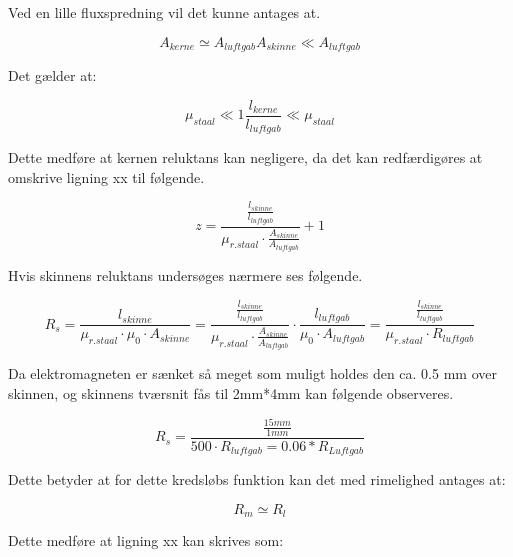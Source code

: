 Ved en lille fluxspredning vil det kunne antages at.

\begin{equation}
A_{kerne} \simeq A_{luftgab}
A_{skinne} \ll A_{luftgab}
\end{equation}

Det gælder at:

\begin{equation}
\mu_{staal} \ll 1
\frac{l_{kerne}}{l_{luftgab}}\ll \mu_{staal}
\end{equation}

Dette medføre at kernen reluktans kan negligere, da det kan redfærdigøres at omskrive ligning xx til følgende.

\begin{equation}
z =
\frac{
	\frac{l_{skinne}}{l_{luftgab}} }
{\mu_{r.staal} \cdot \frac{A_{skinne}}{A_{luftgab}} }
+ 1
\end{equation}

Hvis skinnens reluktans undersøges nærmere ses følgende.


\begin{equation}
R_s =  \frac{l_{skinne}}{\mu_{r.staal} \cdot \mu_0 \cdot A_{skinne} }
=
\frac{
	\frac{l_{skinne}}{l_{luftgab}} }
{\mu_{r.staal} \cdot \frac{A_{skinne}}{A_{luftgab}} }
\cdot \frac{l_{luftgab}}{\mu_0 \cdot A_{luftgab}}
=
\frac{
	\frac{l_{skinne}}{l_{luftgab}} }
	{\mu_{r.staal} \cdot R_{luftgab}}
\end{equation}


Da elektromagneten er sænket så meget som muligt holdes den ca. 0.5 mm over skinnen, og skinnens tværsnit fås til 2mm*4mm kan følgende observeres.

\begin{equation}
R_s =
\frac{
	\frac{15 mm}{1 mm} }
{ 500 \cdot R_{luftgab} = 0.06*R_{Luftgab}}
	\end{equation}

Dette betyder at for dette kredsløbs funktion kan det med rimelighed antages at:

\begin{equation}
R_m \simeq R_l
	\end{equation}

Dette medføre at ligning xx kan skrives som:

